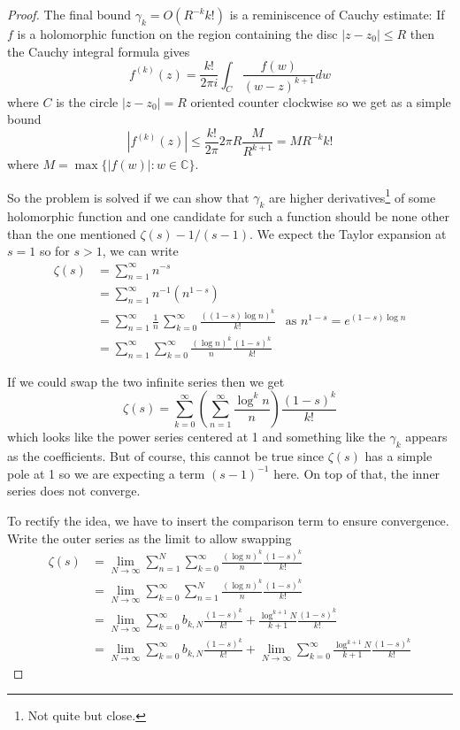 \documentclass{article}
\newcommand{\C}{\mathbb{C}}
\begin{document}
\begin{proof}
The final bound $\gamma_k = O(R^{-k} k!)$ is a reminiscence of Cauchy estimate: If $f$ is a holomorphic function on the region containing the disc $|z - z_0| \leq R$ then the Cauchy integral formula gives
$$f^{(k)} (z) = \dfrac{k!}{2 \pi i} \int_C \dfrac{f(w)}{(w - z)^{k + 1}} dw$$
where $C$ is the circle $|z - z_0| = R$ oriented counter clockwise so we get as a simple bound
$$|f^{(k)}(z)| \leq \frac{k!}{2 \pi} 2 \pi R \frac{M}{R^{k+1}} = M R^{-k} k!$$
where $M = \max\{|f(w)| : w \in \C\}$.

So the problem is solved if we can show that $\gamma_k$ are higher derivatives\footnote{Not quite but close.} of some holomorphic function and one candidate for such a function should be none other than the one mentioned $\zeta(s) - 1 / (s - 1)$. We expect the Taylor expansion at $s = 1$ so for $s > 1$, we can write
\begin{align*}
\zeta(s) &= \sum_{n = 1}^{\infty} n^{-s}\\
&= \sum_{n = 1}^{\infty} n^{-1} (n^{1-s})\\
&= \sum_{n = 1}^{\infty} \frac{1}{n} \, \sum_{k = 0}^{\infty} \frac{((1 - s) \log n)^k}{k!} &\text{as } n^{1-s} = e^{(1-s)\log n}\\
&= \sum_{n = 1}^{\infty} \sum_{k = 0}^{\infty} \frac{(\log n)^k}{n} \frac{(1 - s)^k}{k!}
\end{align*}

If we could swap the two infinite series then we get
$$\zeta(s) = \sum_{k = 0}^{\infty} \left( \sum_{n = 1}^{\infty} \frac{\log^k n}{n} \right) \frac{(1 - s)^k}{k!}$$
which looks like the power series centered at 1 and something like the $\gamma_k$ appears as the coefficients. But of course, this cannot be true since $\zeta(s)$ has a simple pole at 1 so we are expecting a term $(s-1)^{-1}$ here. On top of that, the inner series does not converge.

To rectify the idea, we have to insert the comparison term to ensure convergence. Write the outer series as the limit to allow swapping
\begin{align*}
\zeta(s) &= \lim_{N \rightarrow \infty} \sum_{n = 1}^{N} \sum_{k = 0}^{\infty} \frac{(\log n)^k}{n} \frac{(1 - s)^k}{k!} \\
&= \lim_{N \rightarrow \infty} \sum_{k = 0}^{\infty} \sum_{n = 1}^{N} \frac{(\log n)^k}{n} \frac{(1 - s)^k}{k!} \\
&= \lim_{N \rightarrow \infty} \sum_{k = 0}^{\infty} b_{k,N} \frac{(1 - s)^k}{k!} + \frac{\log^{k+1} N}{k+1} \frac{(1 - s)^k}{k!}\\
&= \lim_{N \rightarrow \infty} \sum_{k = 0}^{\infty} b_{k,N} \frac{(1 - s)^k}{k!} + \lim_{N \rightarrow \infty} \sum_{k = 0}^{\infty} \frac{\log^{k+1} N}{k+1} \frac{(1 - s)^k}{k!}
\end{align*}


\end{proof}
\end{document}
